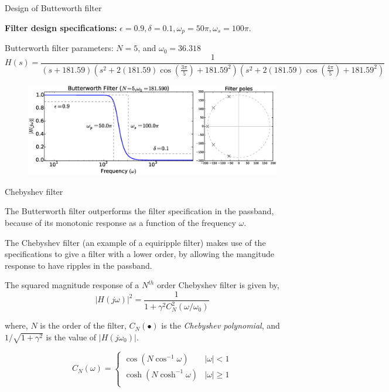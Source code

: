 \documentclass{beamer}
\begin{document}
\begin{frame}{Design of Butteworth filter}
\begin{tiny}
\textbf{Filter design specifications:} $\epsilon=0.9, \delta = 0.1, \omega_p = 50\pi, \omega_s = 100\pi$.

Butterworth filter parameters: $N=5$, and $\omega_0=36.318$
\[ H(s) = \frac{1}{(s+181.59)\left(s^2+2(181.59)\cos \left(\frac{3\pi}{5}\right)+181.59^2\right)\left(s^2+2(181.59)\cos \left(\frac{4\pi}{5}\right)+181.59^2\right)} \]
\end{tiny}

\begin{figure}
\centering
\includegraphics[width=\textwidth]{img/butter_filt_example.eps}
\end{figure}
\end{frame}

\begin{frame}{Chebyshev filter}
\begin{small}
The Butterworth filter outperforms the filter specification in the passband, because of its monotonic response as a function of the frequency $\omega$.

The Chebyshev filter (an example of a equiripple filter) makes use of the specifications to give a filter with a lower order, by allowing the mangitude response to have ripples in the passband.

The squared magnitude response of a $N^{th}$ order Chebyshev filter is given by,
\[ \left|H(j\omega)\right|^2 = \frac{1}{1+\gamma^2C_N^2(\omega/\omega_0)} \]

where, $N$ is the order of the filter, $C_N(\bullet)$ is the \textit{Chebyshev polynomial}, and $1/\sqrt{1+\gamma^2}$ is the value of $|H(j\omega_0)|$.

\[ C_N\left(\omega\right) = \begin{cases}
\cos \left(N \cos^{-1} \omega\right) & \left|\omega\right| < 1 \\
\cosh \left(N \cosh^{-1} \omega\right) & \left|\omega\right| \geq 1 \\
\end{cases} \]
\end{small}
\end{frame}
\end{document}
